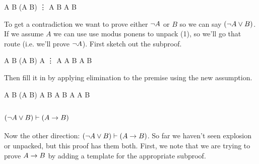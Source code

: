 \begin{fitchproof}
   {A \eif B}              
  \open
   {\enot(\enot A \eor B)} 
   {\vdots}
   {\enot A \eor B}
   {\ebot}                 
  \close
   {\enot A \eor B}        
\end{fitchproof}      

To get a contradiction we want to prove either $\neg A$ or $B$ so we can say
$(\neg A\vee B)$. If we assume $A$ we can use use modus ponens to unpack (1),
so we'll go that route (i.e. we'll prove $\neg A$). First sketch out the
subproof.

\begin{fitchproof}
   {A \eif B}              
  \open
   {\enot(\enot A \eor B)} 
  \open
   {A}                     
   {\vdots}
   {\ebot}                 
  \close
   {\enot A}               
   {\enot A \eor B}        
   {\ebot}                 
  \close
   {\enot A \eor B}        
\end{fitchproof}      

Then fill it in by applying \sif elimination to the premise using the new
assumption.

\begin{fitchproof}
   {A \eif B}              
  \open
   {\enot(\enot A \eor B)} 
  \open
   {A}                     
   {B}                     
   {\enot A \eor B}        
   {\ebot}                 
  \close
   {\enot A}               
   {\enot A \eor B}        
   {\ebot}                 
  \close
          
\end{fitchproof}      

\subsubsection{$(\neg A \vee B)\vdash(A \rightarrow B)$}

Now the other direction: $(\neg A \vee B)\vdash(A \rightarrow B)$. So far we haven't
seen explosion or \sor unpacked, but this proof has them both. First, we note
that we are trying to prove $A \rightarrow B$ by adding a template for the appropriate
subproof.

